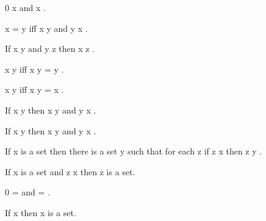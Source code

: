 \documentclass[a4paper,draft]{amsproc}
\begin{document}
\begin{forthel}
\begin{theorem}
 0 \subset x  and  x \subset {} .
\end{theorem}

\begin{theorem}
 x = y  iff  x \subset y  and  y \subset x .
\end{theorem}

\begin{theorem}
If  x \subset y  and  y \subset z  then  x \subset z .
\end{theorem}

\begin{theorem}
 x \subset y  iff  x \cup y = y .
\end{theorem}

\begin{theorem}
 x \subset y  iff  x \cap y = x .
\end{theorem}

\begin{theorem}
If  x \subset y  then  \bigcup x \subset \bigcup y 
and  \bigcap y \subset \bigcap x .
\end{theorem}

\begin{theorem}
If  x \in y  then  x \subset \bigcup y  
and  \bigcap y \subset x .
\end{theorem}


\begin{axiom}
If  x  is a set then there is a set  y  such that for each
 z  if  z \subset x  then  z \in y .
\end{axiom}


\begin{theorem}
If  x  is a set and  z \subset x  then  z  is a set.
\end{theorem}

\begin{theorem}
 0 = \bigcap {}  and   = \bigcup {} .
\end{theorem}

\begin{theorem}
If  x   then  \bigcap x  is a set.
\end{theorem}


\end{forthel}
\end{document}
